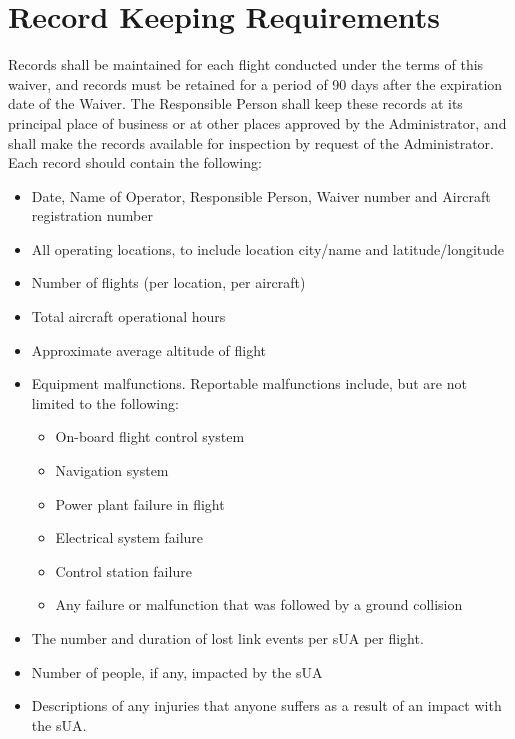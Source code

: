 \documentclass[
]{book}
\providecommand{\tightlist}{%
  \setlength{\itemsep}{0pt}\setlength{\parskip}{0pt}}
\begin{document}
\hypertarget{s39p-rk}{%
\section{Record Keeping Requirements}\label{s39p-rk}}

Records shall be maintained for each flight conducted under the terms of this waiver, and records must be retained for a period of 90 days after the expiration date of the Waiver. The Responsible Person shall keep these records at its principal place of business or at other places approved by the Administrator, and shall make the records available for inspection by request of the Administrator. Each record should contain the following:

\begin{itemize}
\item
  Date, Name of Operator, Responsible Person, Waiver number and Aircraft registration number
\item
  All operating locations, to include location city/name and latitude/longitude
\item
  Number of flights (per location, per aircraft)
\item
  Total aircraft operational hours
\item
  Approximate average altitude of flight
\item
  Equipment malfunctions. Reportable malfunctions include, but are not limited to the following:

  \begin{itemize}
  \tightlist
  \item
    On-board flight control system
  \item
    Navigation system
  \item
    Power plant failure in flight
  \item
    Electrical system failure
  \item
    Control station failure
  \item
    Any failure or malfunction that was followed by a ground collision
  \end{itemize}
\item
  The number and duration of lost link events per sUA per flight.
\item
  Number of people, if any, impacted by the sUA
\item
  Descriptions of any injuries that anyone suffers as a result of an impact with the sUA.
\end{itemize}
\end{document}
